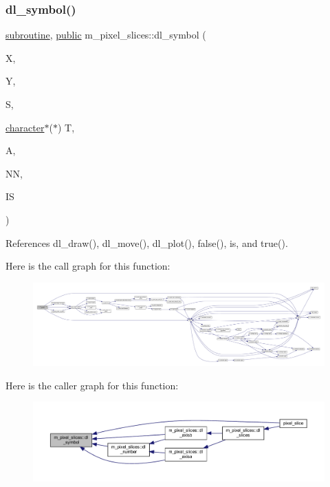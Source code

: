 \subsubsection{\texorpdfstring{dl\+\_\+symbol()}{dl\_symbol()}}
{\footnotesize\ttfamily \hyperlink{M__stopwatch_83_8txt_acfbcff50169d691ff02d4a123ed70482}{subroutine}, \hyperlink{M__stopwatch_83_8txt_a2f74811300c361e53b430611a7d1769f}{public} m\+\_\+pixel\+\_\+slices\+::dl\+\_\+symbol (\begin{DoxyParamCaption}\item[{}]{X,  }\item[{}]{Y,  }\item[{}]{S,  }\item[{\hyperlink{option__stopwatch_83_8txt_abd4b21fbbd175834027b5224bfe97e66}{character}$\ast$($\ast$)}]{T,  }\item[{}]{A,  }\item[{}]{NN,  }\item[{}]{IS }\end{DoxyParamCaption})}



References dl\+\_\+draw(), dl\+\_\+move(), dl\+\_\+plot(), false(), is, and true().

Here is the call graph for this function\+:
\nopagebreak
\begin{figure}[H]
\begin{center}
\leavevmode
\includegraphics[width=350pt]{namespacem__pixel__slices_a2a40fc08575b18772b520c7b5b81a91e_cgraph}
\end{center}
\end{figure}
Here is the caller graph for this function\+:
\nopagebreak
\begin{figure}[H]
\begin{center}
\leavevmode
\includegraphics[width=350pt]{namespacem__pixel__slices_a2a40fc08575b18772b520c7b5b81a91e_icgraph}
\end{center}
\end{figure}
\mbox{\label{namespacem__pixel__slices_ad35fa14bd29e8e895f22de6500b6b5ff}} 

